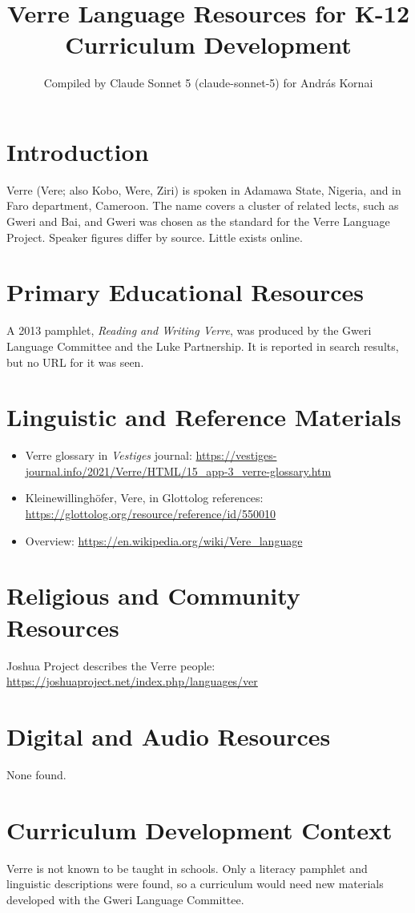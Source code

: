 \documentclass[12pt]{article}
\title{Verre Language Resources for K-12 Curriculum Development}
\author{Compiled by Claude Sonnet 5 (claude-sonnet-5) for Andr\'as Kornai}
\date{}
\begin{document}
\maketitle

\section{Introduction}
Verre (Vere; also Kobo, Were, Ziri) is spoken in Adamawa State, Nigeria, and in Faro department, Cameroon. The name covers a cluster of related lects, such as Gweri and Bai, and Gweri was chosen as the standard for the Verre Language Project. Speaker figures differ by source. Little exists online.

\section{Primary Educational Resources}
A 2013 pamphlet, \emph{Reading and Writing Verre}, was produced by the Gweri Language Committee and the Luke Partnership. It is reported in search results, but no URL for it was seen.

\section{Linguistic and Reference Materials}
\begin{itemize}
\item Verre glossary in \emph{Vestiges} journal: \url{https://vestiges-journal.info/2021/Verre/HTML/15_app-3_verre-glossary.htm}
\item Kleinewillinghöfer, Vere, in Glottolog references: \url{https://glottolog.org/resource/reference/id/550010}
\item Overview: \url{https://en.wikipedia.org/wiki/Vere_language}
\end{itemize}

\section{Religious and Community Resources}
Joshua Project describes the Verre people: \url{https://joshuaproject.net/index.php/languages/ver}

\section{Digital and Audio Resources}
None found.

\section{Curriculum Development Context}
Verre is not known to be taught in schools. Only a literacy pamphlet and linguistic descriptions were found, so a curriculum would need new materials developed with the Gweri Language Committee.
\end{document}
